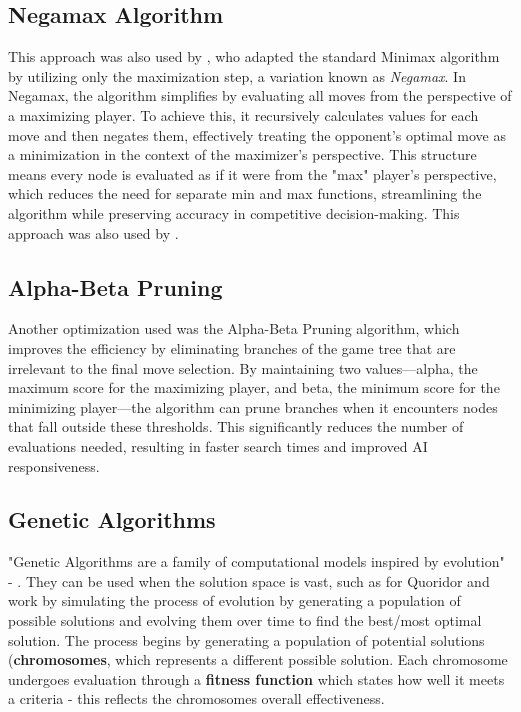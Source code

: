 \documentclass[review]{cmpreport}
\begin{document}
\subsection{Negamax Algorithm}
This approach was also used by \cite{glendenning2005mastering}, who adapted the standard Minimax algorithm by utilizing only the maximization step, a variation known as \textit{Negamax}. In Negamax, the algorithm simplifies by evaluating all moves from the perspective of a maximizing player. To achieve this, it recursively calculates values for each move and then negates them, effectively treating the opponent’s optimal move as a minimization in the context of the maximizer’s perspective. This structure means every node is evaluated as if it were from the "max" player's perspective, which reduces the need for separate min and max functions, streamlining the algorithm while preserving accuracy in competitive decision-making. This approach was also used by \cite{respall2018monte}.

\subsection{Alpha-Beta Pruning}
Another optimization used was the Alpha-Beta Pruning algorithm, which improves the efficiency by eliminating branches of the game tree that are irrelevant to the final move selection. By maintaining two values—alpha, the maximum score for the maximizing player, and beta, the minimum score for the minimizing player—the algorithm can prune branches when it encounters nodes that fall outside these thresholds. This significantly reduces the number of evaluations needed, resulting in faster search times and improved AI responsiveness.

\subsection{Genetic Algorithms}
"Genetic Algorithms are a family of computational models inspired by evolution" - \cite{mathew2012genetic}. They can be used when the solution space is vast, such as for Quoridor and work by simulating the process of evolution by generating a population of possible solutions and evolving them over time to find the best/most optimal solution. The process begins by generating a population of potential solutions (\textbf{chromosomes}, which represents a different possible solution. Each chromosome undergoes evaluation through a \textbf{fitness function} which states how well it meets a criteria - this reflects the chromosomes overall effectiveness.
\end{document}
